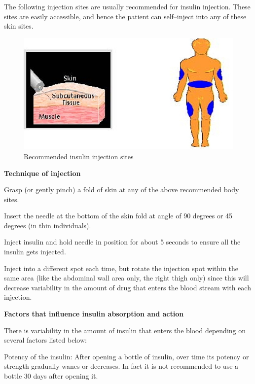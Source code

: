 The following injection sites are usually recommended for insulin injection. These sites are easily accessible, and hence the patient can self–inject into any of these skin sites.

\begin{figure}
\includegraphics{images/089.jpg}
\caption{Recommended insulin injection sites}
\end{figure}

\textbf{Technique of injection}

\item Grasp (or gently pinch) a fold of skin at any of the above recommended body sites.

 \item Insert the needle at the bottom of the skin fold at angle of 90 degrees or 45 degrees (in thin individuals).

 \item Inject insulin and hold needle in position for about 5 seconds to ensure all the insulin gets injected.

 \item Inject into a different spot each time, but rotate the injection spot within the same area (like the abdominal wall area only, the right thigh only) since this will decrease variability in the amount of drug that enters the blood stream with each injection.

\textbf{Factors that influence insulin absorption and action}

There is variability in the amount of insulin that enters the blood depending on several factors listed below:

\item Potency of the insulin: After opening a bottle of insulin, over time its potency or strength gradually wanes or decreases. In fact it is not recommended to use a bottle 30 days after opening it.

